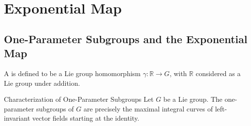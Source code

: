 \documentclass[../main.tex]{subfiles}
\begin{document}
\ifSubfilesClassLoaded{

    
}{}

\chapter{ Exponential Map }

\section{One-Parameter Subgroups and the Exponential Map}
\begin{definition}{}{}
    A  is defined to be a Lie group homomorphism \(\gamma \colon \mathbb{R} \to G\), with \(\mathbb{R}\) considered as a Lie group under addition.
\end{definition}

\begin{theorem}{Characterization of One-Parameter Subgroups}{}
Let \(G\) be a Lie group. The one-parameter subgroups of \(G\) are precisely the maximal integral curves of left-invariant vector fields starting at the identity.
\end{theorem}
\end{document}
